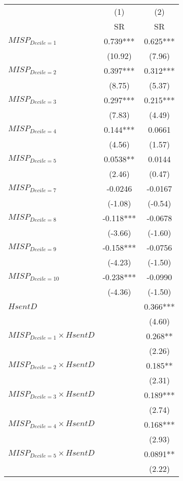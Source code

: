 \begin{tabular}{lcc}
\toprule
        & (1)     & (2) \\
        & SR      & SR \\
\midrule
$MISP_{Decile = 1} $ & 0.739*** & 0.625*** \\
        & (10.92) & (7.96) \\
$MISP_{Decile = 2} $ & 0.397*** & 0.312*** \\
        & (8.75)  & (5.37) \\
$MISP_{Decile = 3} $ & 0.297*** & 0.215*** \\
        & (7.83)  & (4.49) \\
$MISP_{Decile = 4} $ & 0.144*** & 0.0661 \\
        & (4.56)  & (1.57) \\
$MISP_{Decile = 5} $ & 0.0538** & 0.0144 \\
        & (2.46)  & (0.47) \\
$MISP_{Decile = 7} $ & -0.0246 & -0.0167 \\
        & (-1.08) & (-0.54) \\
$MISP_{Decile = 8} $ & -0.118*** & -0.0678 \\
        & (-3.66) & (-1.60) \\
$MISP_{Decile = 9} $ & -0.158*** & -0.0756 \\
        & (-4.23) & (-1.50) \\
$MISP_{Decile = 10} $ & -0.238*** & -0.0990 \\
        & (-4.36) & (-1.50) \\
$HsentD$ &         & 0.366*** \\
        &         & (4.60) \\
$MISP_{Decile = 1} \times HsentD$ &         & 0.268** \\
        &         & (2.26) \\
$MISP_{Decile = 2} \times HsentD$ &         & 0.185** \\
        &         & (2.31) \\
$MISP_{Decile = 3} \times HsentD$ &         & 0.189*** \\
        &         & (2.74) \\
$MISP_{Decile = 4} \times HsentD$ &         & 0.168*** \\
        &         & (2.93) \\
$MISP_{Decile = 5} \times HsentD$ &         & 0.0891** \\
        &         & (2.22) \\

\end{tabular}
